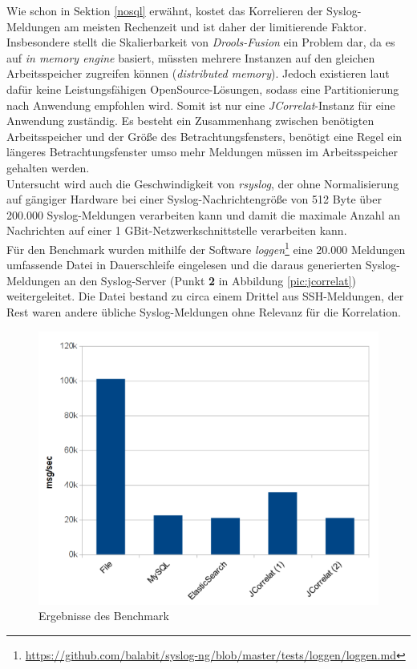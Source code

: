 Wie schon in Sektion \ref{nosql} erwähnt, kostet das Korrelieren der Syslog-Meldungen am 
meisten Rechenzeit und ist daher der limitierende Faktor. Insbesondere stellt die 
Skalierbarkeit von \textit{Drools-Fusion} ein Problem dar, da es auf \textit{in memory 
engine} basiert, müssten mehrere Instanzen auf den gleichen Arbeitsspeicher zugreifen 
können (\textit{distributed memory}). Jedoch existieren laut \cite{reissmann} dafür keine 
Leistungsfähigen OpenSource-Lösungen, sodass eine Partitionierung nach Anwendung 
empfohlen wird. Somit ist nur eine \textit{JCorrelat}-Instanz für eine Anwendung 
zuständig. Es besteht ein Zusammenhang zwischen benötigten Arbeitsspeicher und der Größe 
des Betrachtungsfensters, benötigt eine Regel ein längeres Betrachtungsfenster umso mehr 
Meldungen müssen im Arbeitsspeicher gehalten werden.\\
Untersucht wird auch die Geschwindigkeit von \textit{rsyslog}, der ohne Normalisierung 
auf gängiger Hardware bei einer Syslog-Nachrichtengröße von 512 Byte über 200.000 
Syslog-Meldungen verarbeiten kann und damit die maximale Anzahl an Nachrichten auf einer 
1 GBit-Netzwerkschnittstelle verarbeiten kann.\\

Für den Benchmark wurden mithilfe der Software 
\textit{loggen}\footnote{\url{https://github.com/balabit/syslog-ng/blob/master/tests/loggen/loggen.md}}
 eine 20.000 Meldungen umfassende Datei in Dauerschleife  eingelesen und die daraus 
generierten Syslog-Meldungen an den Syslog-Server (Punkt \textbf{2} in Abbildung 
\ref{pic:jcorrelat}) weitergeleitet. Die Datei bestand zu circa einem Drittel aus 
SSH-Meldungen, der Rest waren andere übliche Syslog-Meldungen ohne Relevanz für die 
Korrelation.

\begin{figure}[htbp]
    \caption{Ergebnisse des Benchmark}
    \label{pic:benchmark}\vspace{0.2cm}
    \centering
    \includegraphics[scale=0.46]{img/benchmark}  
\end{figure}

